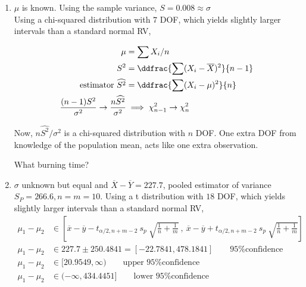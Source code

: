 \begin{enumerate}
	\item  $ \mu $ is known. Using the sample variance, $ S = 0.008 \approx \sigma $\\
	Using a chi-squared distribution with $ 7 $ DOF, which yields slightly larger intervals than a standard normal RV,
	
	\begin{subequations}
		\begin{align}
			\mu &= \sum X_i / n \nonumber \\
			S^2 &= \ddfrac{\sum (X_i - \overline{X})^2}{n-1} \nonumber \\
			\text{estimator } \widehat{S^2} &= \ddfrac{\sum (X_i - \mu)^2}{n} \\
			\frac{(n-1)S^2}{\sigma^2} \to \frac{n\widehat{S^2}}{\sigma^2} &\implies \chi^2_{n-1} \to \chi^2_{n}
		\end{align}
	\end{subequations}
	
	Now, $ n \widehat{S^2} /\sigma^2 $ is a chi-squared distribution with $ n $ DOF. One extra DOF from knowledge of the population mean, acts like one extra observation.
	
	What burning time?\\
	
	\item  $ \sigma $ unknown but equal and $ \overline{X} - \overline{Y} = 227.7 $, pooled estimator of variance $ S_P = 266.6, n = m = 10$.
	Using a t distribution with $ 18 $ DOF, which yields slightly larger intervals than a standard normal RV,
	\begin{subequations}
		\begin{align}
			\mu_1 - \mu_2 &\in \left[ \overline{x} - \overline{y} - t_{\alpha / 2, n+m-2}\ s_p\ \sqrt{\frac{1}{n} + \frac{1}{m}}\ ,\ \overline{x} - \overline{y} + t_{\alpha / 2, n+m-2}\ s_p\ \sqrt{\frac{1}{n} + \frac{1}{m}} \right]  \nonumber \\
			\mu_1 - \mu_2 &\in 227.7 \pm 250.4841 = [-22.7841, 478.1841] \qquad \text{95\% confidence}  \nonumber \\
			\mu_1 - \mu_2 &\in  [20.9549, \infty) \qquad \text{upper 95\% confidence} \nonumber \\
			\mu_1 - \mu_2 &\in  (-\infty, 434.4451] \qquad \text{lower 95\% confidence} \nonumber 
		\end{align}
	\end{subequations}
	

\end{enumerate}
